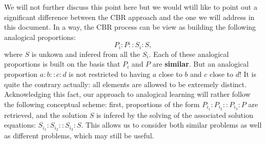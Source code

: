 We will not further discuss this point here but we would wtill like to point out a
significant difference between the CBR approach and the one we will address in
this document. In a way, the CBR process can be view as building the following
analogical proportions:
$$P_i:P :: S_i : S, $$
where $S$ is unkown and infered from all the $S_i$. Each of these analogical
proportions is built on the basis that $P_i$ and $P$ are \textbf{similar}. But
an analogical proportion $a:b::c:d$ is not restricted to having $a$ close to
$b$ and $c$ close to $d$! It is quite the contrary actually: all elements are
allowed to be extremely distinct. Acknowledging this fact, our approach to
analogical learning will rather follow the following conceptual scheme: first,
proportions of the form $P_{i_1} : P_{i_2} :: P_{i_3} : P$ are retrieved, and
the solution $S$ is infered by the solving of the associated solution
equations: $S_{i_1} : S_{i_2} :: S_{i_3} : S$. This allows us to consider both
similar problems as well as different problems, which may still be useful.
